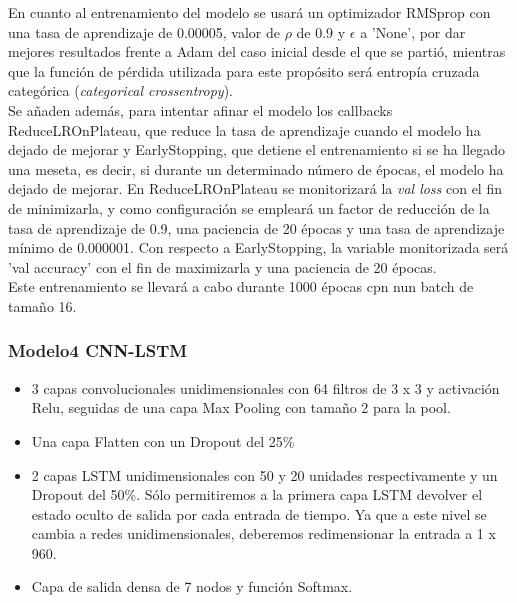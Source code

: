 \documentclass[11pt,a4paper,spanish]{book}
\begin{document}
	En cuanto al entrenamiento del modelo se usará un optimizador RMSprop con una tasa de aprendizaje de 0.00005, valor de $\rho$ de 0.9 y $\epsilon$ a 'None', por dar mejores resultados frente a Adam del caso inicial desde el que se partió, mientras que la función de pérdida utilizada para este propósito será entropía cruzada categórica (\emph{categorical crossentropy}).\\
	Se añaden además, para intentar afinar el modelo los callbacks ReduceLROnPlateau, que reduce la tasa de aprendizaje cuando el modelo ha dejado de mejorar y EarlyStopping, que detiene el entrenamiento si se ha llegado una meseta, es decir, si durante un determinado número de épocas, el modelo ha dejado de mejorar. En ReduceLROnPlateau se monitorizará la \emph{val loss} con el fin de minimizarla, y como configuración se empleará un factor de reducción de la tasa de aprendizaje de 0.9, una paciencia de 20 épocas y una tasa de aprendizaje mínimo de 0.000001.
	Con respecto a EarlyStopping, la variable monitorizada será 'val accuracy' con el fin de maximizarla y una paciencia de 20 épocas.\\
	Este entrenamiento se llevará a cabo durante 1000 épocas cpn nun batch de tamaño 16.


	
		\subsubsection{Modelo4 CNN-LSTM}
		\label{cap4:Modelo4}
		\begin{itemize}
			\item 3 capas convolucionales unidimensionales con 64 filtros de 3 x 3 y activación Relu, seguidas de una capa Max Pooling con tamaño 2 para la pool.
			
			\item Una capa Flatten con un Dropout del 25\%
			
			\item 2 capas LSTM unidimensionales con 50 y 20 unidades respectivamente y un Dropout del 50\%. Sólo permitiremos a la primera capa LSTM devolver el estado oculto de salida por cada entrada de tiempo. Ya que a este nivel se cambia a redes unidimensionales, deberemos redimensionar la entrada a 1 x 960.
			
			\item Capa de salida densa de 7 nodos y función Softmax.
			
		\end{itemize}
\end{document}
